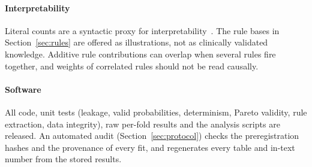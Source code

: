 \paragraph{Interpretability}
Literal counts are a syntactic proxy for interpretability~\cite{gacto2011}. The rule
bases in Section~\ref{sec:rules} are offered as illustrations, not as clinically
validated knowledge. Additive rule contributions can overlap when several rules fire
together, and weights of correlated rules should not be read causally.

\paragraph{Software}
All code, unit tests (leakage, valid probabilities, determinism, Pareto validity,
rule extraction, data integrity), raw per-fold results and the analysis scripts are
released. An automated audit (Section~\ref{sec:protocol}) checks the preregistration
hashes and the provenance of every fit, and regenerates every table and in-text
number from the stored results.
